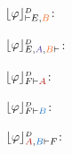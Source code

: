 \begin{example}
\begin{multicols}{3}
{$\projectionDefinitional{\varphi}{\seq E, \hC{B}}$:
\begin{scriptsize}
\begin{prooftree}
 
 
 
 
\end{prooftree}
\end{scriptsize}

$\projectionDefinitional{\varphi}{E, \hD{A}, \hC{B} \seq }$:
\begin{tiny}
\begin{prooftree}
 
		 
		 
	 
\end{prooftree}
\end{tiny}
}
\end{multicols}




\begin{multicols}{3}{
$\projectionDefinitional{\varphi}{F \seq \hA{A}}$:
\begin{scriptsize}
\begin{prooftree}
 
 
 
\end{prooftree}
\end{scriptsize}

$\projectionDefinitional{\varphi}{F \seq \hB{B}}$:
\begin{scriptsize}
\begin{prooftree}
 
 
 
\end{prooftree}
\end{scriptsize}

$\projectionDefinitional{\varphi}{\hA{A}, \hB{B} \seq F}$:
\begin{scriptsize}
\begin{prooftree}
		 
	 
\end{prooftree}
\end{scriptsize}
}
\end{multicols}






\end{example}
